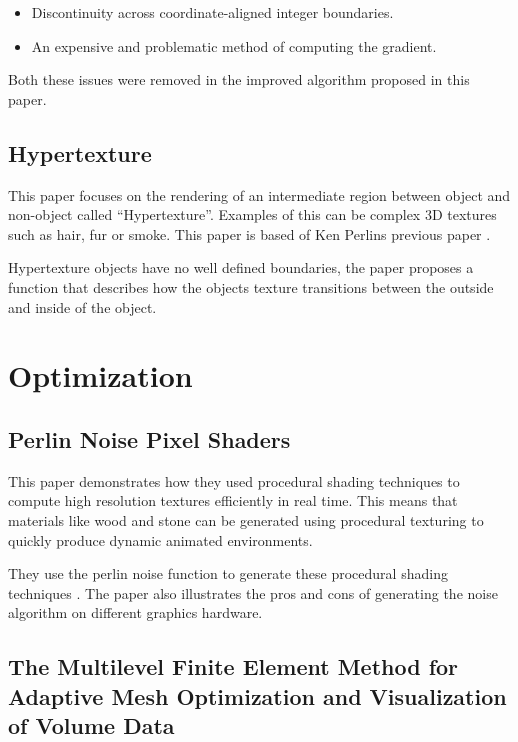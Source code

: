 \documentclass{scrartcl}
\begin{document}
\begin{itemize}
\item {Discontinuity across coordinate-aligned integer boundaries.}
\item  {An expensive and problematic method of computing the gradient.}
\end{itemize}

Both these issues were removed in the improved algorithm proposed in this paper.
\par 


\subsection{Hypertexture \cite{perlin1989hypertexture}}

This paper focuses on the rendering of an intermediate region between object and non-object called ``Hypertexture''.  Examples of this can be complex 3D textures such as hair, fur or smoke.
This paper is based of Ken Perlins previous paper \cite{perlin1985image}.

 Hypertexture objects have no well defined boundaries, the paper proposes a function that describes how the objects texture transitions between the outside and inside of the object.





\section{Optimization}

\subsection{Perlin Noise Pixel Shaders \cite{hart2001perlin}}

This paper demonstrates how they used procedural shading techniques to compute high resolution textures efficiently in real time. This means that materials like wood and stone can be generated using procedural texturing to quickly produce dynamic animated environments.

They use the perlin noise function to generate these procedural shading techniques \cite{perlin2002improving}. The paper also illustrates the pros and cons of generating the noise algorithm on different graphics hardware.
\par

\subsection{The Multilevel Finite Element Method for Adaptive Mesh Optimization and Visualization of Volume Data \cite{grosso1997multilevel}}
\end{document}
